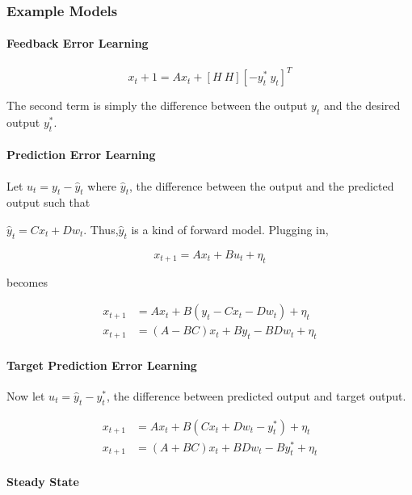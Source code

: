 \documentclass[../main.tex]{subfiles}
\begin{document}
\subsubsection{Example Models}\label{example-models}

\paragraph{Feedback Error Learning}\label{feedback-error-learning}

\[x_t+1 = Ax_t + [H\ H][-y_t^*\ y_t]^T\]

The second term is simply the difference between the output \(y_t\) and
the desired output \(y_t^*\).

\paragraph{Prediction Error Learning}\label{prediction-error-learning}

Let \(u_t = y_t - \hat{y}_t\) where \(\hat{y}_t\), the difference
between the output and the predicted output such that

\(\hat{y}_t = Cx_t + Dw_t\). Thus,\(\hat{y}_t\) is a kind of forward
model. Plugging in,

\[x_{t+1} = Ax_t + Bu_t + \eta_t\]

becomes

\[
\begin{aligned}
x_{t+1} &= Ax_t + B(y_t - Cx_t - Dw_t) + \eta_t \\
x_{t+1} &= (A-BC)x_t + By_t - BDw_t + \eta_t
\end{aligned}
\]

\paragraph{Target Prediction Error
Learning}\label{target-prediction-error-learning}

Now let \(u_t = \hat{y}_t - y^*_t\), the difference between predicted
output and target output.

\[
\begin{aligned}
x_{t+1} &= Ax_t + B(Cx_t + Dw_t - y^*_t) + \eta_t \\
x_{t+1} &= (A+BC)x_t + BDw_t - By^*_t + \eta_t
\end{aligned}
\]

\paragraph{Steady State}\label{steady-state}
\end{document}
